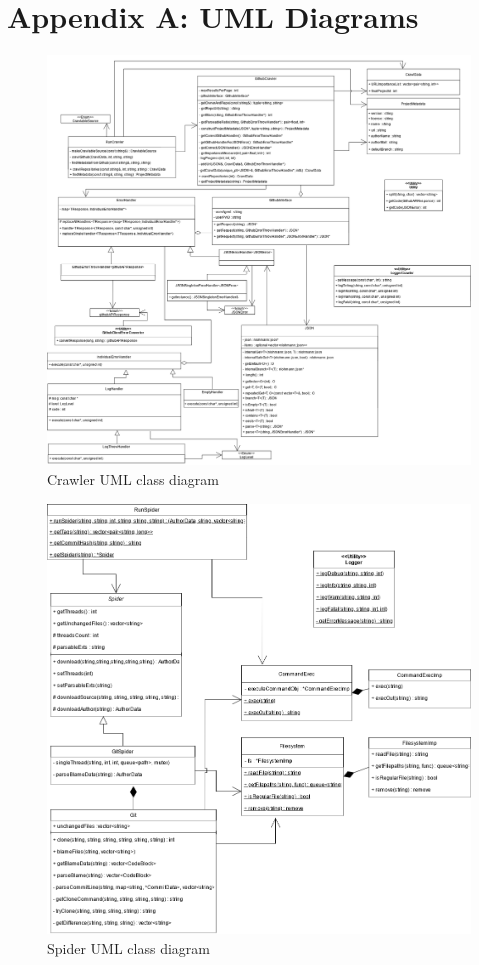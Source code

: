 \documentclass{article}
\begin{document}
\clearpage
\section*{Appendix A: UML Diagrams}

\begin{figure}[h]
    \centering
    \includegraphics[width = \linewidth]{CrawlerUML.png}
    \caption{Crawler UML class diagram}
    \label{fig:umlcrawler}
\end{figure}

\begin{figure}
    \centering
    \includegraphics[width = \linewidth]{SpiderUML.png}
    \caption{Spider UML class diagram}
    \label{fig:umlspider}
\end{figure}
\end{document}
